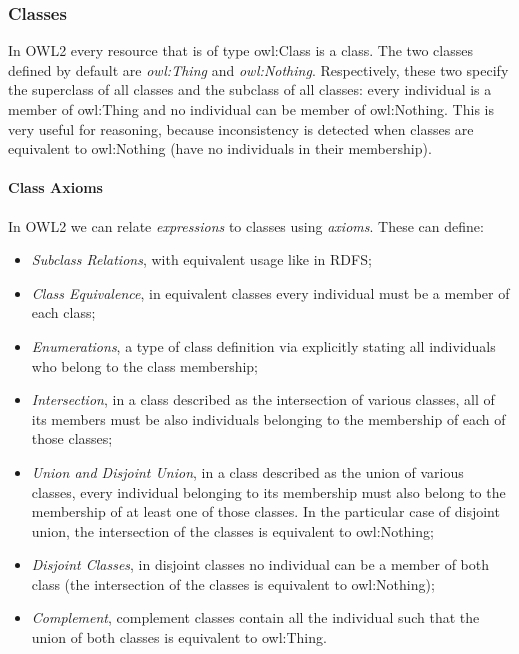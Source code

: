  \subsubsection*{Classes}

In \gls{OWL2} every resource that is of type owl:Class is a class. The two classes defined by default are \emph{owl:Thing} and \emph{owl:Nothing}. Respectively, these two specify the superclass of all classes and the subclass of all classes: every individual is a member of owl:Thing and no individual can be member of owl:Nothing. This is very useful for reasoning, because inconsistency is detected when classes are equivalent to owl:Nothing (have no individuals in their membership).

\paragraph{Class Axioms}

In \gls{OWL2} we can relate \emph{expressions} to classes using \emph{axioms}. These can define:

\begin{itemize}
    \item\emph{Subclass Relations}, with equivalent usage like in \gls{RDFS};
    \item\emph{Class Equivalence}, in equivalent classes every individual must be a member of each class;
    \item\emph{Enumerations}, a type of class definition via explicitly stating all individuals who belong to the class membership;
    \item\emph{Intersection}, in a class described as the intersection of various classes, all of its members must be also individuals belonging to the membership of each of those classes;
    \item \emph{Union and Disjoint Union}, in a class described as the union of various classes, every individual belonging to its membership must also belong to the membership of at least one of those classes. In the particular case of disjoint union, the intersection of the classes is equivalent to owl:Nothing;
    \item\emph{Disjoint Classes}, in disjoint classes no individual can be a member of both class (the intersection of the classes is equivalent to owl:Nothing);
    \item\emph{Complement}, complement classes contain all the individual such that the union of both classes is equivalent to owl:Thing.
      
\end{itemize}



